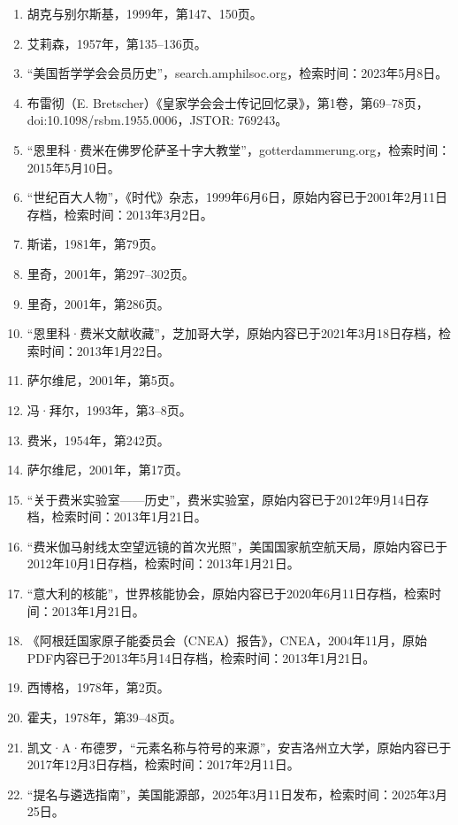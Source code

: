 \begin{enumerate}
\item 胡克与别尔斯基，1999年，第147、150页。
\item 艾莉森，1957年，第135–136页。
\item “美国哲学学会会员历史”，search.amphilsoc.org，检索时间：2023年5月8日。
\item 布雷彻（E. Bretscher）《皇家学会会士传记回忆录》，第1卷，第69–78页，doi:10.1098/rsbm.1955.0006，JSTOR: 769243。
\item “恩里科·费米在佛罗伦萨圣十字大教堂”，gotterdammerung.org，检索时间：2015年5月10日。
\item “世纪百大人物”，《时代》杂志，1999年6月6日，原始内容已于2001年2月11日存档，检索时间：2013年3月2日。
\item 斯诺，1981年，第79页。
\item 里奇，2001年，第297–302页。
\item 里奇，2001年，第286页。
\item “恩里科·费米文献收藏”，芝加哥大学，原始内容已于2021年3月18日存档，检索时间：2013年1月22日。
\item 萨尔维尼，2001年，第5页。
\item 冯·拜尔，1993年，第3–8页。
\item 费米，1954年，第242页。
\item 萨尔维尼，2001年，第17页。
\item “关于费米实验室——历史”，费米实验室，原始内容已于2012年9月14日存档，检索时间：2013年1月21日。
\item “费米伽马射线太空望远镜的首次光照”，美国国家航空航天局，原始内容已于2012年10月1日存档，检索时间：2013年1月21日。
\item “意大利的核能”，世界核能协会，原始内容已于2020年6月11日存档，检索时间：2013年1月21日。
\item 《阿根廷国家原子能委员会（CNEA）报告》，CNEA，2004年11月，原始PDF内容已于2013年5月14日存档，检索时间：2013年1月21日。
\item 西博格，1978年，第2页。
\item 霍夫，1978年，第39–48页。
\item 凯文·A·布德罗，“元素名称与符号的来源”，安吉洛州立大学，原始内容已于2017年12月3日存档，检索时间：2017年2月11日。
\item “提名与遴选指南”，美国能源部，2025年3月11日发布，检索时间：2025年3月25日。
\end{enumerate}
